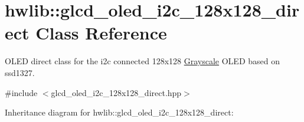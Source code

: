 \hypertarget{classhwlib_1_1glcd__oled__i2c__128x128__direct}{}\section{hwlib\+:\+:glcd\+\_\+oled\+\_\+i2c\+\_\+128x128\+\_\+direct Class Reference}
\label{classhwlib_1_1glcd__oled__i2c__128x128__direct}


O\+L\+ED direct class for the i2c connected 128x128 \hyperlink{classhwlib_1_1Grayscale}{Grayscale} O\+L\+ED based on ssd1327.  




{\ttfamily \#include $<$glcd\+\_\+oled\+\_\+i2c\+\_\+128x128\+\_\+direct.\+hpp$>$}



Inheritance diagram for hwlib\+:\+:glcd\+\_\+oled\+\_\+i2c\+\_\+128x128\+\_\+direct\+:
